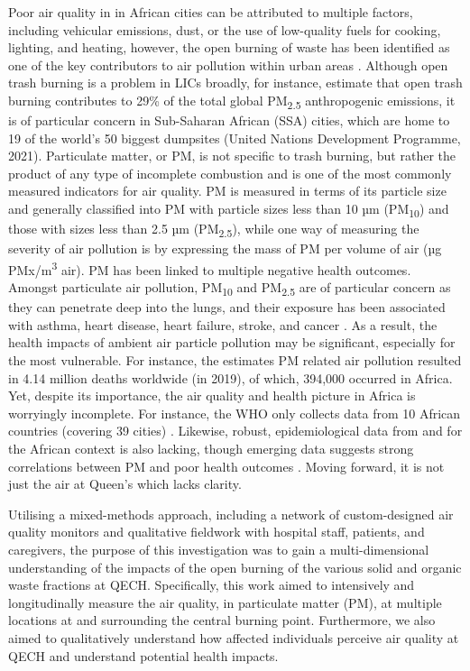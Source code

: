 \documentclass[
  authoryear,
  review,
  3p]{elsarticle}
\begin{document}
Poor air quality in in African cities can be attributed to multiple
factors, including vehicular emissions, dust, or the use of low-quality
fuels for cooking, lighting, and heating, however, the open burning of
waste has been identified as one of the key contributors to air
pollution within urban areas
\citep{amegah2018proliferation, bulto2020impact}. Although open trash
burning is a problem in LICs broadly, for instance,
\citet{wiedinmyer2014global} estimate that open trash burning
contributes to 29\% of the total global PM\textsubscript{2.5}
anthropogenic emissions, it is of particular concern in Sub-Saharan
African (SSA) cities, which are home to 19 of the world's 50 biggest
dumpsites (United Nations Development Programme, 2021). Particulate
matter, or PM, is not specific to trash burning, but rather the product
of any type of incomplete combustion and is one of the most commonly
measured indicators for air quality. PM is measured in terms of its
particle size and generally classified into PM with particle sizes less
than 10 µm (PM\textsubscript{10}) and those with sizes less than 2.5 µm
(PM\textsubscript{2.5}), while one way of measuring the severity of air
pollution is by expressing the mass of PM per volume of air (µg
PMx/m\textsuperscript{3} air). PM has been linked to multiple negative
health outcomes. Amongst particulate air pollution, PM\textsubscript{10}
and PM\textsubscript{2.5} are of particular concern as they can
penetrate deep into the lungs, and their exposure has been associated
with asthma, heart disease, heart failure, stroke, and cancer
\citep{mohapatra2014effect, xing2016impact}. As a result, the health
impacts of ambient air particle pollution may be significant, especially
for the most vulnerable. For instance, the \citet{ihme2019ambient}
estimates PM related air pollution resulted in 4.14 million deaths
worldwide (in 2019), of which, 394,000 occurred in Africa. Yet, despite
its importance, the air quality and health picture in Africa is
worryingly incomplete. For instance, the WHO only collects data from 10
African countries (covering 39 cities)
\citep{worldhealthorganization2016ambient}. Likewise, robust,
epidemiological data from and for the African context is also lacking,
though emerging data suggests strong correlations between PM and poor
health outcomes \citep{coker2018narrative, heft-neal2018robust}. Moving
forward, it is not just the air at Queen's which lacks clarity.

Utilising a mixed-methods approach, including a network of
custom-designed air quality monitors and qualitative fieldwork with
hospital staff, patients, and caregivers, the purpose of this
investigation was to gain a multi-dimensional understanding of the
impacts of the open burning of the various solid and organic waste
fractions at QECH. Specifically, this work aimed to intensively and
longitudinally measure the air quality, in particulate matter (PM), at
multiple locations at and surrounding the central burning point.
Furthermore, we also aimed to qualitatively understand how affected
individuals perceive air quality at QECH and understand potential health
impacts.
\end{document}
